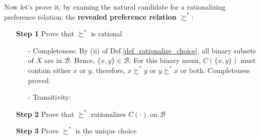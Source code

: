 Now let's prove it, by examing the natural candidate for a rationalizing preference relation: the \textbf{revealed preference relation $\succsim^*$}:
\begin{enumerate}
    \item[\textbf{Step 1}] Prove that $\succsim^*$ is rational
    \begin{enumerate}
        \item[-] Completeness: By (ii) of Def.\ref{def_rationalize_choice}, all binary subsets of $X$ are in $\mathcal{B}$. Hence, $\{x,y\}\in\mathcal{B}$. For this binary menu, $C(\{x,y\})$ must contain either $x$ or $y$, therefore, $x\succsim^*y$ or $y\succsim^* x$ or both. Completeness proved.
        \item[-] Transitivity: 
    \end{enumerate} 
    \item[\textbf{Step 2}] Prove that $\succsim^*$ rationalizes $C(\cdot)$ on $\mathcal{B}$
    \item[\textbf{Step 3}] Prove $\succsim^*$ is the unique choice
\end{enumerate}
